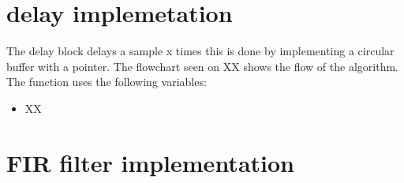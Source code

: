 \section{delay implemetation}
The delay block delays a sample x times this is done by implementing a circular buffer with a pointer. The flowchart seen on XX shows the flow of the algorithm.
The function uses the following variables:
\begin{itemize}
\item XX
\end{itemize}


\section{FIR filter implementation}